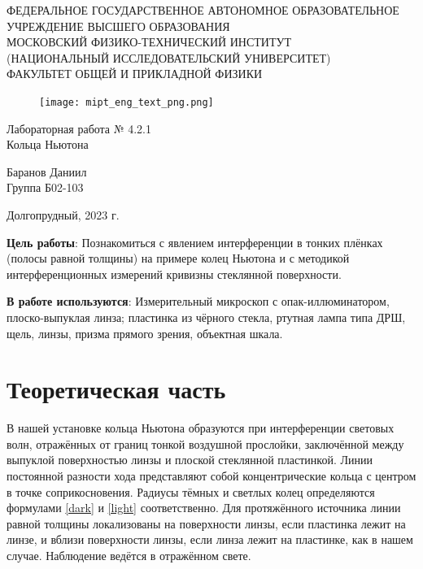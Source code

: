 \documentclass[a4paper,12pt]{article} %
\begin{document}
\begin{center}
	\footnotesize{ФЕДЕРАЛЬНОЕ ГОСУДАРСТВЕННОЕ АВТОНОМНОЕ ОБРАЗОВАТЕЛЬНОЕ 			УЧРЕЖДЕНИЕ ВЫСШЕГО ОБРАЗОВАНИЯ}\\
	\footnotesize{МОСКОВСКИЙ ФИЗИКО-ТЕХНИЧЕСКИЙ ИНСТИТУТ\\(НАЦИОНАЛЬНЫЙ 			ИССЛЕДОВАТЕЛЬСКИЙ УНИВЕРСИТЕТ)}\\
	\footnotesize{ФАКУЛЬТЕТ ОБЩЕЙ И ПРИКЛАДНОЙ ФИЗИКИ\\}
	\hfill \break
	\hfill \break
	\hfill \break
	\hfill \break
\end{center}


\begin{figure}[h]
    \centering
    \texttt{[image: mipt\_eng\_text\_png.png]}
    \label{fig:my_label}
\end{figure}


\begin{center}   
    \hfill \break
	\hfill \break
	\hfill \break
	\large{Лабораторная работа № 4.2.1\\ \hfill \break\Large{Кольца Ньютона}}\\
	\hfill \break
	\hfill \break
	\hfill \break
	\hfill \break
	\begin{flushright}
		Баранов Даниил\\
		Группа Б02-103
	\end{flushright}
	\hfill \break
	\hfill \break
	\hfill \break
\end{center}
\hfill \break
\hfill \break
\hfill \break
\hfill \break
\begin{center}
	Долгопрудный, 2023 г.
\end{center}
\thispagestyle{empty}

\newpage



\textbf{Цель работы}: Познакомиться с явлением интерференции в тонких плёнках (полосы равной толщины) на примере колец Ньютона и с методикой интерференционных измерений кривизны стеклянной поверхности.

\textbf{В работе используются}: Измерительный микроскоп с опак-иллюминатором, плоско-выпуклая линза; пластинка из чёрного стекла, ртутная лампа типа ДРШ, щель, линзы, призма прямого зрения, объектная шкала.

\section{Теоретическая часть}

В нашей установке кольца Ньютона образуются при интерференции световых волн, отражённых от границ тонкой воздушной прослойки, заключённой между выпуклой поверхностью линзы и плоской стеклянной пластинкой.
Линии постоянной разности хода представляют собой концентрические кольца с центром в точке соприкосновения. Радиусы тёмных и светлых колец определяются формулами \eqref{dark} и \eqref{light} соответственно. Для протяжённого источника линии равной толщины локализованы на поверхности линзы, если пластинка лежит на линзе, и вблизи поверхности линзы, если линза лежит на пластинке, как в нашем случае. Наблюдение ведётся в отражённом свете.
\end{document}
